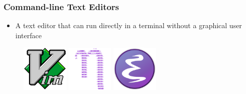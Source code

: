 \documentclass{beamer}
\begin{document}
\begin{frame}
	\frametitle{\textbf{Command-line Text Editors}}
	
	\begin{itemize}
		\item A text editor that can run directly in a terminal without a graphical user interface
	\end{itemize}

	\begin{figure}[h]
			\centering
			\includegraphics[width=0.2\textwidth]{img/Vim_logo.png} 
			\hspace{0.5cm}
			\includegraphics[width=0.2\textwidth]{img/nano_logo.png} 
			\hspace{0.5cm}
			\includegraphics[width=0.2\textwidth]{img/Emacs_logo.png} 
	\end{figure}
\end{frame}
\end{document}
